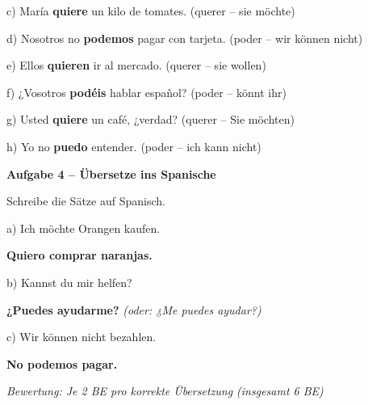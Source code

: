 \documentclass[11pt, a4paper]{article}
\newcommand{\fachfarbe}{spanisch}
\newcommand{\punktebox}[1]{\hfill\fbox{\small \_/#1}}
\newcommand{\lsg}[1]{\textcolor{loesung}{\textbf{#1}}}
\newenvironment{aufgabe}[1]{%
    \needspace{5\baselineskip}%
    \nopagebreak[4]%
    \vspace{10pt}
    \noindent\textbf{\textcolor{\fachfarbe}{Aufgabe #1}}
    \nopagebreak[4]%
    \vspace{5pt}
    \nopagebreak[4]%
    \begin{list}{}{\leftmargin=0pt}
    \item[]
}{%
    \end{list}
}
\begin{document}
\noindent
c) María \lsg{quiere} un kilo de tomates. \hfill (querer -- sie möchte)

\vspace{0.8em}

\noindent
d) Nosotros no \lsg{podemos} pagar con tarjeta. \hfill (poder -- wir können nicht)

\vspace{0.8em}

\noindent
e) Ellos \lsg{quieren} ir al mercado. \hfill (querer -- sie wollen)

\vspace{0.8em}

\noindent
f) ¿Vosotros \lsg{podéis} hablar español? \hfill (poder -- könnt ihr)

\vspace{0.8em}

\noindent
g) Usted \lsg{quiere} un café, ¿verdad? \hfill (querer -- Sie möchten)

\vspace{0.8em}

\noindent
h) Yo no \lsg{puedo} entender. \hfill (poder -- ich kann nicht)

\vspace{15pt}


\begin{aufgabe}{4 -- Übersetze ins Spanische}
Schreibe die Sätze auf Spanisch. \punktebox{6}
\end{aufgabe}

\noindent
a) Ich möchte Orangen kaufen.

\lsg{Quiero comprar naranjas.}

\vspace{1em}

\noindent
b) Kannst du mir helfen?

\lsg{¿Puedes ayudarme?} \textit{(oder: ¿Me puedes ayudar?)}

\vspace{1em}

\noindent
c) Wir können nicht bezahlen.

\lsg{No podemos pagar.}

\vspace{0.5em}

\textit{Bewertung: Je 2 BE pro korrekte Übersetzung (insgesamt 6 BE)}
\end{document}
